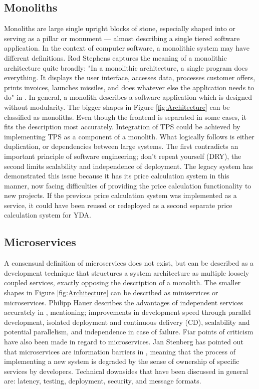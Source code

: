 \subsection{Monoliths}
Monoliths are large single upright blocks of stone, especially shaped into or serving as a pillar or monument --- almost describing a single tiered software application. In the context of computer software, a monolithic system may have different definitions. Rod Stephens captures the meaning of a monolithic architecture quite broadly: "In a monolithic architecture, a single program does everything. It displays the user interface, accesses data, processes customer offers, prints invoices, launches missiles, and does whatever else the application needs to do" in \cite{rod-BSE}. In general, a monolith describes a software application which is designed without modularity. The bigger shapes in Figure \ref{fig:Architecture} can be classified as monoliths. Even though the frontend is separated in some cases, it fits the description most accurately. Integration of TPS could be achieved by implementing TPS as a component of a monolith. What logically follows is either duplication, or dependencies between large systems. The first contradicts an important principle of software engineering; don't repeat yourself (DRY), the second limits scalability and independence of deployment. The legacy system has demonstrated this issue because it has its price calculation system in this manner, now facing difficulties of providing the price calculation functionality to new projects. If the previous price calculation system was implemented as a service, it could have been reused or redeployed as a second separate price calculation system for YDA.

\subsection{Microservices}
A consensual definition of microservices does not exist, but can be described as a development technique that structures a system architecture as multiple loosely coupled services, exactly opposing the description of a monolith. The smaller shapes in Figure \ref{fig:Architecture} can be described as miniservices or microservices. Philipp Hauer describes the advantages of independent services accurately in \cite{microservices}, mentioning; improvements in development speed through parallel development, isolated deployment and continuous delivery (CD), scalability and potential parallelism, and independence in case of failure. Fiar points of criticism have also been made in regard to microservices. Jan Stenberg has pointed out that microservices are information barriers in \cite{JS-microservices}, meaning that the process of implementing a new system is degraded by the sense of ownership of specific services by developers. Technical downsides that have been discussed in general are: latency, testing, deployment, security, and message formats.

